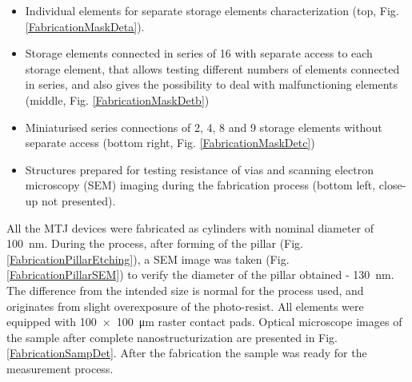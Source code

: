     \begin{itemize}[noitemsep,label=\textbullet]
    	\item Individual elements for separate storage elements characterization (top, Fig. \ref{FabricationMaskDeta}).
    	\item Storage elements connected in series of 16 with separate access to each storage element, that allows testing different numbers of elements connected in series, and also gives the possibility to deal with malfunctioning elements (middle, Fig. \ref{FabricationMaskDetb}) 
    	\item Miniaturised series connections of 2, 4, 8 and 9 storage elements without separate access (bottom right, Fig. \ref{FabricationMaskDetc})
    	\item Structures prepared for testing resistance of vias and scanning electron microscopy (SEM) imaging during the fabrication process (bottom left, close-up not presented).
    \end{itemize}
    
    All the MTJ devices were fabricated as cylinders with nominal diameter of \SI{100}{\nano\meter}. During the process, after forming of the pillar (Fig. \ref{FabricationPillarEtching}), a SEM image was taken (Fig. \ref{FabricationPillarSEM}) to verify the diameter of the pillar obtained - \SI{130}{\nano\meter}. The difference from the intended size is normal for the process used, and originates from slight overexposure of the photo-resist. All elements were equipped with \SI[product-units = power]{100 x 100}{\micro\meter} raster contact pads. Optical microscope images of the sample after complete nanostructurization are presented in Fig. \ref{FabricationSampDet}. After the fabrication the sample was ready for the measurement process.

